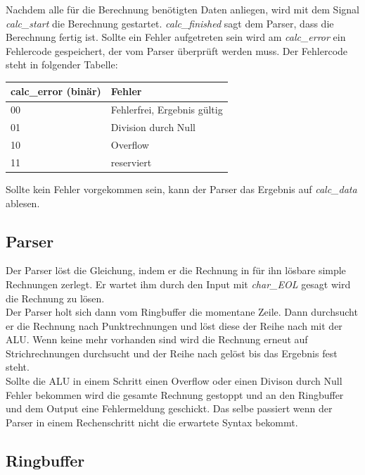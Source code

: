 Nachdem alle für die Berechnung benötigten Daten anliegen, wird mit dem Signal \textit{calc\_start} die Berechnung gestartet. \textit{calc\_finished}
sagt dem Parser, dass die Berechnung fertig ist. Sollte ein Fehler aufgetreten sein wird am \textit{calc\_error} ein Fehlercode gespeichert, der vom
Parser überprüft werden muss. Der Fehlercode steht in folgender Tabelle:

\begin{center}
\begin{tabular}[!ht]{|l|l|}
\hline calc\_error (binär) & Fehler\\
	\hline
	00 & Fehlerfrei, Ergebnis gültig\\ 
	01 & Division durch Null\\ 
	10 & Overflow\\ 
	11 & reserviert\\
 \hline
\end{tabular}
\end{center}

Sollte kein Fehler vorgekommen sein, kann der Parser das Ergebnis auf \textit{calc\_data} ablesen. 

\subsection{Parser}

Der Parser löst die Gleichung, indem er die Rechnung in für ihn lösbare simple Rechnungen zerlegt.
Er wartet ihm durch den Input mit \textit{char\_EOL} gesagt wird die Rechnung zu lösen.\\
Der Parser holt sich dann vom Ringbuffer die momentane Zeile. Dann durchsucht er die Rechnung nach 
Punktrechnungen und löst diese der Reihe nach mit der ALU. Wenn keine mehr vorhanden sind wird
die Rechnung erneut auf Strichrechnungen durchsucht und der Reihe nach gelöst bis das Ergebnis 
fest steht.\\
Sollte die ALU in einem Schritt einen Overflow oder einen Divison durch Null Fehler bekommen wird 
die gesamte Rechnung gestoppt und an den Ringbuffer und dem Output eine Fehlermeldung geschickt.
Das selbe passiert wenn der Parser in einem Rechenschritt nicht die erwartete Syntax bekommt.\\

\subsection{Ringbuffer}

